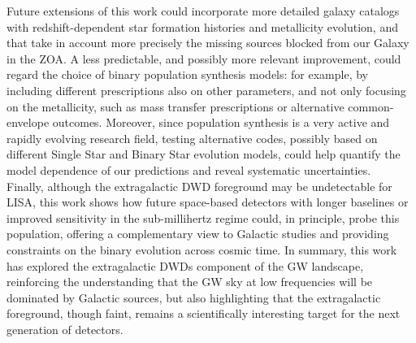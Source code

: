 Future extensions of this work could incorporate more detailed galaxy catalogs with redshift-dependent star formation histories and metallicity evolution, and that take in account more precisely the missing sources blocked from our Galaxy in the ZOA.
A less predictable, and possibly more relevant improvement, could regard the choice of binary population synthesis models: for example, by including different prescriptions also on other parameters, and not only focusing on the metallicity, such as mass transfer prescriptions or alternative common-envelope outcomes.
Moreover, since population synthesis is a very active and rapidly evolving research field, testing alternative codes, possibly based on different Single Star and Binary Star evolution models, could help quantify the model dependence of our predictions and reveal systematic uncertainties.\vspace{3mm}\\
Finally, although the extragalactic DWD foreground may be undetectable for LISA, this work shows how future space-based detectors with longer baselines or improved sensitivity in the sub-millihertz regime could, in principle, probe this population, offering a complementary view to Galactic studies and providing constraints on the binary evolution across cosmic time.
In summary, this work has explored the extragalactic DWDs component of the GW landscape, reinforcing the understanding that the GW sky at low frequencies will be dominated by Galactic sources, but also highlighting that the extragalactic foreground, though faint, remains a scientifically interesting target for the next generation of detectors.
